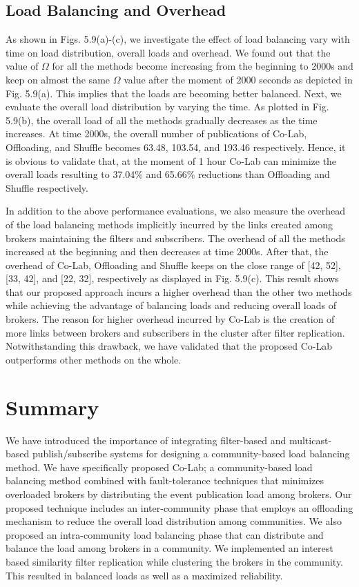 \subsection{Load Balancing and Overhead}\label{Chap5_05_04}

As shown in Figs. 5.9(a)-(c), we investigate the effect of load balancing vary with time on load distribution, overall loads and overhead. We found out that the value of $\Omega$ for all the methods become increasing from the beginning to 2000s and keep on almost the same $\Omega$ value after the moment of 2000 seconds as depicted in Fig. 5.9(a). This implies that the loads are becoming better balanced. Next, we evaluate the overall load distribution by varying the time. As plotted in Fig. 5.9(b), the overall load of all the methods gradually decreases as the time increases. At time 2000s, the overall number of publications of Co-Lab, Offloading, and Shuffle becomes 63.48, 103.54, and 193.46 respectively. Hence, it is obvious to validate that, at the moment of 1 hour Co-Lab can minimize the overall loads resulting to 37.04\% and 65.66\% reductions than Offloading and Shuffle respectively.

In addition to the above performance evaluations, we also measure the overhead of the load balancing methods implicitly incurred by the links created among brokers maintaining the filters and subscribers. The overhead of all the methods increased at the beginning and then decreases at time 2000s. After that, the overhead of Co-Lab, Offloading and Shuffle keeps on the close range of [42, 52], [33, 42], and [22, 32], respectively as displayed in Fig. 5.9(c). This result shows that our proposed approach incurs a higher overhead than the other two methods while achieving the advantage of balancing loads and reducing overall loads of brokers. The reason for higher overhead incurred by Co-Lab is the creation of more links between brokers and subscribers in the cluster after filter replication. Notwithstanding  this drawback, we have validated that the proposed Co-Lab outperforms other methods on the whole.

\section{Summary}\label{Chap5_06}
We have introduced the importance of integrating filter-based and multicast-based publish/subscribe systems for designing a community-based load balancing method. We have specifically proposed Co-Lab; a community-based load balancing method combined with fault-tolerance techniques that minimizes overloaded brokers by distributing the event publication load among brokers. Our proposed technique includes an inter-community phase that employs an offloading mechanism to reduce the overall load distribution among communities. We also proposed an intra-community load balancing phase that can distribute and balance the load among brokers in a community. We implemented an interest based similarity filter replication while clustering the brokers in the community. This resulted in balanced loads as well as a maximized reliability.

